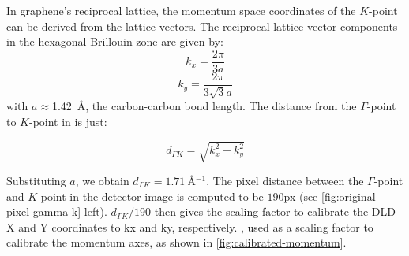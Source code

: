 In graphene's reciprocal lattice, the momentum space coordinates of the $K$-point can be derived from the lattice vectors. The reciprocal lattice vector components in the hexagonal Brillouin zone are given by:
\begin{equation*}
    k_x = \frac{2\pi}{3a}
\end{equation*}
\begin{equation*}
    k_y = \frac{2\pi}{3\sqrt{3}a}
\end{equation*}
with $a\approx$\qty{1.42}{\angstrom}, the carbon-carbon bond length. The distance from the $\Gamma$-point to $K$-point in is just:

\begin{equation*}
    d_{\Gamma K} = \sqrt{k_x^2 + k_y^2}
\end{equation*}

Substituting $a$, we obtain $d_{\Gamma K} = \qty{1.71}{\angstrom^{-1}}$. The pixel distance between the $\Gamma$-point and $K$-point in the detector image is computed to be $190$px (see \cref{fig:original-pixel-gamma-k} left). $d_{\Gamma K}/190$ then gives the scaling factor to calibrate the \gls{DLD} X and Y coordinates to \gls{kx} and \gls{ky}, respectively.
, used as a scaling factor to calibrate the momentum axes, as shown in \cref{fig:calibrated-momentum}.




